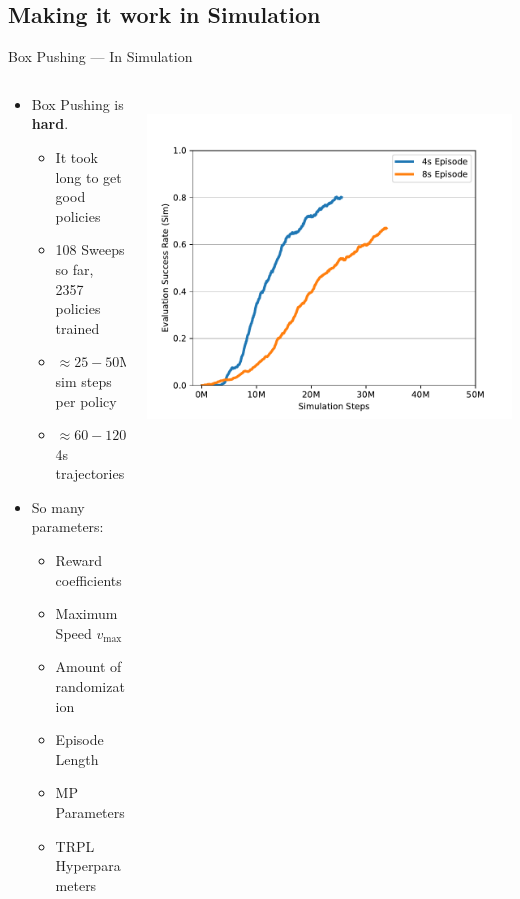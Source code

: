 \documentclass[16:9,en,navbarinfooter]{sdqbeamer}
\begin{document}
\subsection{Making it work in Simulation}
\begin{frame}{Box Pushing --- In Simulation}

\begin{columns}[t]
    \begin{column}{0.4\textwidth}
        \vspace{1cm}
        \begin{itemize}
            \item Box Pushing is \textbf{hard}.
            \begin{itemize}
                \item It took long to get good policies
                \item 108 Sweeps so far, 2357 policies trained
                \item $\approx 25-50\text{M}$ sim steps per policy 
                \item $\approx 60-120\text{K}$ 4s trajectories
            \end{itemize}
            \item So many parameters:
            \begin{itemize}
                \item Reward coefficients
                \item Maximum Speed $v_{\max}$
                \item Amount of randomization
                \item Episode Length
                \item MP Parameters
                \item TRPL Hyperparameters
            \end{itemize}
        \end{itemize}
    \end{column}
    \begin{column}{0.5\textwidth}
        \vspace{.2cm} \\
        \center 
        \includegraphics[width=.9\linewidth]{media/training.pdf} \\

\end{column}
\end{columns}
\end{frame}
\end{document}
